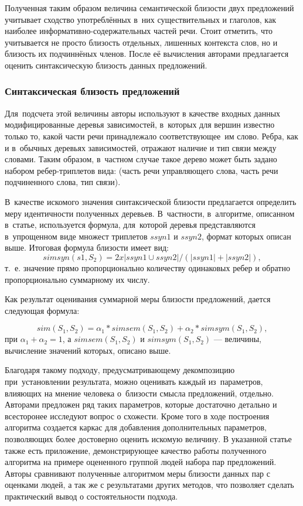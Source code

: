 Полученная таким образом величина семантической близости двух предложений
учитывает сходство употреблённых в~них существительных и глаголов,
как наиболее информативно-содержательных частей речи. 
Стоит отметить, что учитывается не просто близость
отдельных, лишенных контекста слов, но и близость их подчиннёных членов. 
После её вычисления авторами предлагается оценить
синтаксическую близость данных предложений.

\subsubsection{Синтаксическая близость предложений}

Для~подсчета этой величины авторы используют в качестве входных данных
модифицированные деревья зависимостей, в~которых для вершин известно только то, 
какой части речи принадлежало соответствующее~им слово.
Ребра, как и в~обычных деревьях зависимостей, отражают
наличие и тип связи между словами.
Таким образом, в~частном случае такое дерево может быть задано
набором ребер-триплетов вида:
(часть речи управляющего слова, часть речи подчиненного слова, тип связи).

В~качестве искомого значения синтаксической близости предлагается определить меру идентичности полученных деревьев. 
В~частности, в~алгоритме, описанном в~статье,
используется формула, для~которой деревья представляются в~упрощенном виде
множест триплетов $ssyn1$ и $ssyn2$, формат которых описан выше.
Итоговая формула близости имеет вид: 
$$simsyn(s1, S_2) = 2 x |ssyn1 \cup ssyn2| / (|ssyn1| + |ssyn2|),$$ 
т.~е. значение прямо пропорционально количеству одинаковых ребер
и обратно пропорционально суммарному их числу.

Как результат оценивания суммарной меры близости предложений, 
дается следующая формула:

$$sim(S_1, S_2) = \alpha_1 * simsem(S_1, S_2) + \alpha_2*simsym(S_1, S_2),$$
 при $\alpha_1+\alpha_2=1$,
а $simsem(S_1, S_2)$ и 
$simsym(S_1, S_2)$ --- величины, вычисление значений которых, описано выше.


Благодаря такому подходу, предусматривающему декомпозицию при~установлении результата, 
можно оценивать каждый из~параметров, влияющих на мнение человека о~близости смысла предложений, отдельно. Авторами предложен ряд таких параметров, 
которые достаточно детально и всесторонее исследуют вопрос о схожести. Кроме того
в ходе построения алгоритма создается каркас для добавления дополнительных параметров,
позволяющих более достоверно оценить искомую величину. 
В указанной статье также есть приложение, демонстрирующее качество работы
полученного алгоритма на примере оцененного группой людей набора пар предложений.
Авторы сравнивают полученные алгоритмом меры близости данных пар с оценками людей, 
а так же с результатами других методов, что позволяет сделать практический вывод
о состоятельности подхода.

